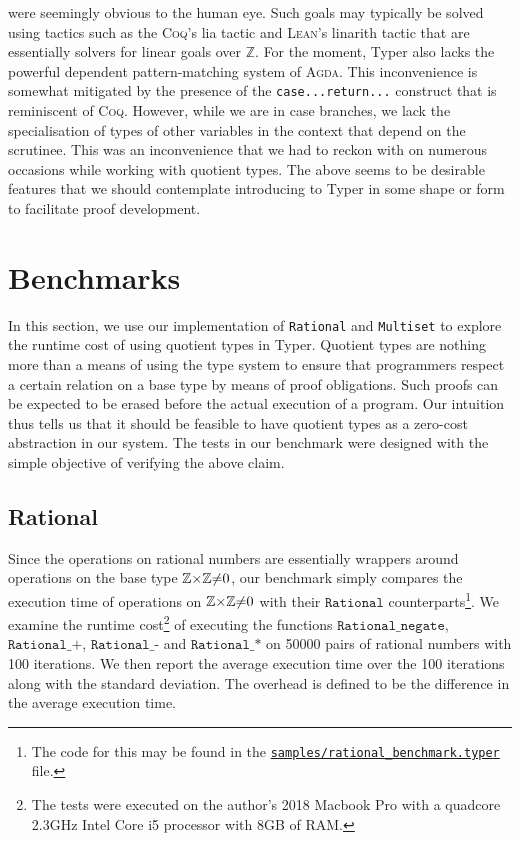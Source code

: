 \documentclass[12pt,twoside,maitrise]{dms}
\theoremstyle{definition}
\numberwithin{equation}{section}
\numberwithin{table}{chapter}
\numberwithin{figure}{chapter}
\newcommand\kw[1] {\textsf{#1}}
\newcommand\id[1] {\texttt{#1}}
\newcommand\fn[1] {\texttt{#1}}
\def\Coq{\textsc{Coq}\xspace}
\def\Agda{\textsc{Agda}\xspace}
\def\Lean{\textsc{Lean}\xspace}
\begin{document}
were seemingly obvious to the human eye. Such goals may typically be solved
using tactics such as the \Coq{}'s \kw{lia} tactic and \Lean{}'s \kw{linarith}
tactic that are essentially solvers for linear goals over $\mathbb{Z}$. For the
moment, Typer also lacks the powerful dependent pattern-matching system of
\Agda{}. This inconvenience is somewhat mitigated by the presence of the
\fn{\kw{case}...\kw{return}...} construct that is
reminiscent of \Coq{}. However, while we are in \kw{case} branches, we lack the
specialisation of types of other variables in the context that depend on the
scrutinee. This was an inconvenience that we had to reckon with on numerous
occasions while working with quotient types. The above seems to be desirable
features that we should contemplate introducing to Typer in some shape or form
to facilitate proof development.

\section*{Benchmarks}\label{sec:quot-benchmark}

In this section, we use our implementation of \id{Rational} and \id{Multiset} to
explore the runtime cost of using quotient types in Typer. Quotient types are
nothing more than a means of using the type system to ensure that programmers
respect a certain relation on a base type by means of proof obligations. Such
proofs can be expected to be erased before the actual execution of a program.
Our intuition thus tells us that it should be feasible to have quotient types as
a zero-cost abstraction in our system. The tests in our benchmark were designed
with the simple objective of verifying the above claim.

\subsection*{Rational}

Since the operations on rational numbers are essentially wrappers around
operations on the base type $\mathbb{Z}{\times}\mathbb{Z}{\ne}0$, our benchmark simply compares the
execution time of operations on $\mathbb{Z}{\times}\mathbb{Z}{\ne}0$ with their $\fn{Rational}$
counterparts\footnote{The code for this may be found in the
\href{https://gitlab.com/jamestjw/typer/-/blob/quot-types-v1.0.0/samples/rational_benchmark.typer}{\id{samples/rational\_benchmark.typer}}
file.}. We examine the runtime cost\footnote{The tests were executed on the
author's 2018 Macbook Pro with a quadcore 2.3GHz Intel Core i5 processor with
8GB of RAM.} of executing the functions $\fn{Rational\_negate}$,
$\fn{Rational\_+}$, $\fn{Rational\_-}$ and $\fn{Rational\_*}$ on 50000 pairs of
rational numbers with 100 iterations. We then report the average execution time
over the 100 iterations along with the standard deviation. The overhead is
defined to be the difference in the average execution time.
\end{document}
